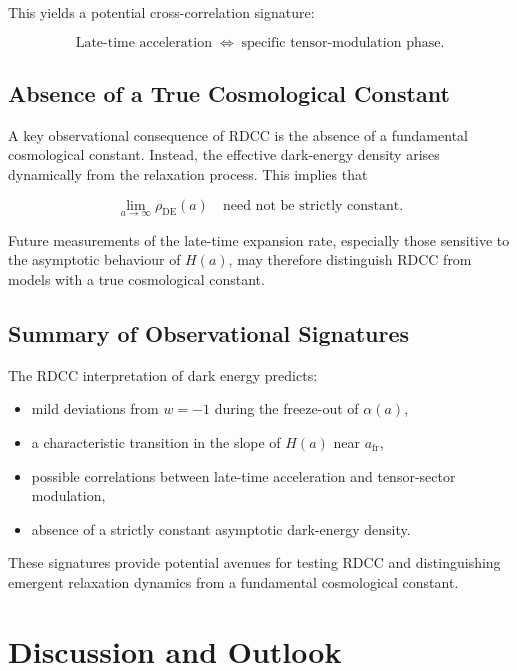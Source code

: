 \documentclass[11pt,a4paper]{article}
\newcommand{\alphaR}{\alpha}
\begin{document}
This yields a potential cross-correlation signature:


\[
\text{Late-time acceleration} \;\Longleftrightarrow\;
\text{specific tensor-modulation phase}.
\]



\subsection{Absence of a True Cosmological Constant}

A key observational consequence of RDCC is the absence of a fundamental
cosmological constant. Instead, the effective dark-energy density arises
dynamically from the relaxation process. This implies that


\[
\lim_{a\to\infty} \rho_{\mathrm{DE}}(a)
\quad\text{need not be strictly constant.}
\]


Future measurements of the late-time expansion rate, especially those sensitive
to the asymptotic behaviour of $H(a)$, may therefore distinguish RDCC from
models with a true cosmological constant.

\subsection{Summary of Observational Signatures}

The RDCC interpretation of dark energy predicts:
\begin{itemize}
    \item mild deviations from $w = -1$ during the freeze-out of $\alphaR(a)$,
    \item a characteristic transition in the slope of $H(a)$ near $a_{\mathrm{fr}}$,
    \item possible correlations between late-time acceleration and tensor-sector modulation,
    \item absence of a strictly constant asymptotic dark-energy density.
\end{itemize}
These signatures provide potential avenues for testing RDCC and distinguishing
emergent relaxation dynamics from a fundamental cosmological constant.


\section{Discussion and Outlook}
\end{document}
